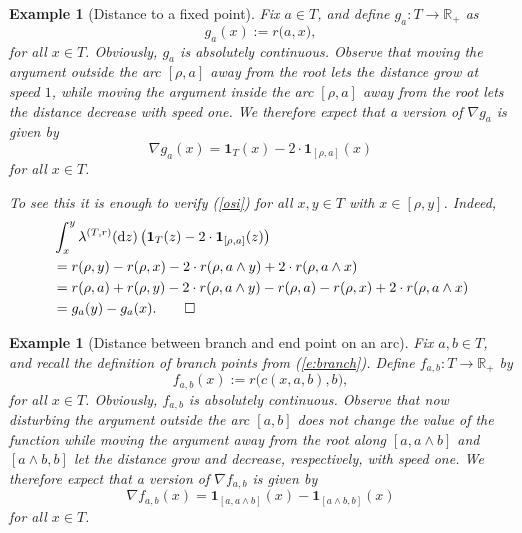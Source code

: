 \documentclass[11pt]{amsart}
\numberwithin{equation}{section}
\newtheorem{example}[definition]{Example}
\begin{document}
{\begin{example}[Distance to a fixed point]\rm Fix $a\in T$, and define $g_a:T\to{{\mathbb R}}_+$ as
\begin{equation}\label{e:h0}
   g_{a}(x)
 :=
   r\big(a,x\big),
\end{equation}
for all $x\in T$.
Obviously,
$g_{a}$ is
   absolutely continuous. Observe that moving the argument outside the arc $[\rho,a]$ away from the root lets the distance grow at speed $1$, while moving the argument inside the arc $[\rho,a]$ away from the root lets the distance decrease with speed one. We therefore expect that a version of $\nabla g_{a}$ is given by
\begin{equation}\label{e:nablah0}
   \nabla g_{a}(x)
 =
   \mathbf{1}_{T}(x)-2\cdot \mathbf{1}_{[\rho,a]}(x)
\end{equation}
for all $x\in T$.

To see this it is enough to verify (\ref{osi}) for all $x,y\in T$ with $x\in[\rho,y]$. Indeed,
{
\begin{equation}\label{e:yy0}
\begin{aligned}
   &\int^y_x\lambda^{(T,r)}(\mathrm{d}z)\,\big(\mathbf{1}_{T}(z)-2\cdot \mathbf{1}_{[\rho,a]}(z)\big)
  \\
 &=
   r(\rho,y)-r(\rho,x)-2\cdot r(\rho,a\wedge y)+2\cdot r(\rho,a\wedge x)
  \\
 &=
   r(\rho,a)+r(\rho,y)-2\cdot r(\rho,a\wedge y)-r(\rho,a)-r(\rho,x)+2\cdot r(\rho,a\wedge x)
  \\
 &=
   g_a(y)-g_a(x).\mbox{\hfill}\qed
\end{aligned}
\end{equation}}
\label{Exp:04}
\end{example}{\smallskip}

\begin{example}[Distance between branch and end point on an arc]\rm Fix $a,b\in T$, and recall the definition of branch points
from (\ref{e:branch}). Define $f_{a,b}:T\to{{\mathbb R}}_+$ by
\begin{equation}\label{e:h}
   f_{a,b}(x)
 :=
   r\big(c(x,a,b),b\big),
\end{equation}
for all $x\in T$.
Obviously,
$f_{a,b}$ is
   absolutely continuous. Observe that now disturbing the argument outside the arc $[a,b]$ does not change the value of the function while moving the argument away from the root along $[a,a\wedge b]$ and $[a\wedge b,b]$ let the distance grow and decrease, respectively, with speed one. We therefore expect that a version of $\nabla f_{a,b}$ is given by
\begin{equation}\label{e:nablah}
   \nabla f_{a,b}(x)
 =
   \mathbf{1}_{[a,a\wedge b]}(x)-\mathbf{1}_{[a\wedge b,b]}(x)
\end{equation}
for all $x\in T$.


\end{example}}
\end{document}
